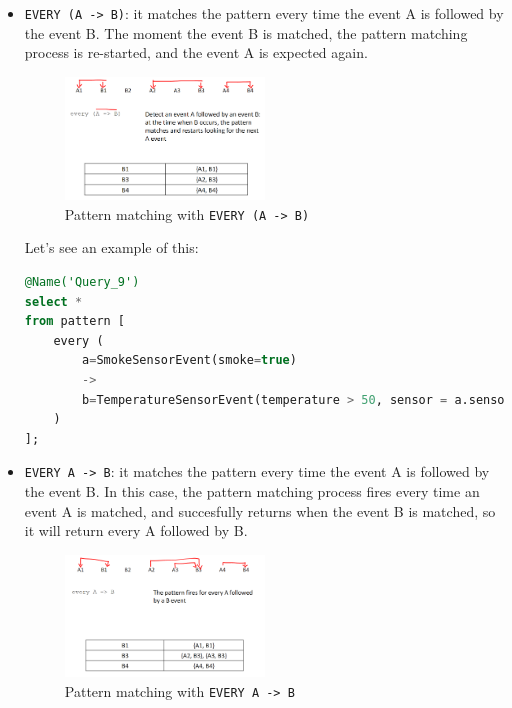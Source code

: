 \begin{itemize}
    \item \texttt{EVERY (A -> B)}: it matches the pattern every time the event
    A is followed by the event B. The moment the event B is matched, the
    pattern matching process is re-started, and the event A is expected again.

    \begin{figure}[H]
        \centering
        \includegraphics[width=0.5\textwidth]{figures/image_everyAB.png}
        \caption{Pattern matching with \texttt{EVERY (A -> B)}}
        \label{fig:pattern_1}
    \end{figure}

    Let's see an example of this:\\

    \begin{lstlisting}[language=SQL]
@Name('Query_9')
select *
from pattern [
    every (
        a=SmokeSensorEvent(smoke=true) 
        ->
        b=TemperatureSensorEvent(temperature > 50, sensor = a.sensor)
    )
];
    \end{lstlisting}

    \item \texttt{EVERY A -> B}: it matches the pattern every time the event A is
    followed by the event B. In this case, the pattern matching process fires every
    time an event A is matched, and succesfully returns when the event B is matched, 
    so it will return every A followed by B.

    \begin{figure}[H]
        \centering
        \includegraphics[width=0.5\textwidth]{figures/image_everyA_B.png}
        \caption{Pattern matching with \texttt{EVERY A -> B}}
        \label{fig:pattern_2}
    \end{figure}


\end{itemize}
